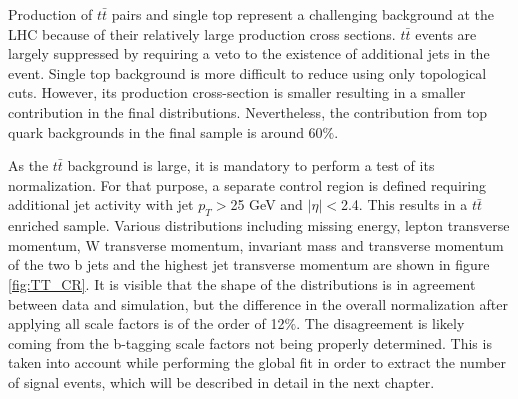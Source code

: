Production of $t\bar{t}$ pairs and single top represent a challenging background at the LHC because of their relatively large production cross sections. $t\bar{t}$ events are largely suppressed by requiring a veto to the existence of additional jets in the event. Single top background is more difficult to reduce using only topological cuts. However, its production cross-section is smaller resulting in a smaller contribution in the final distributions. Nevertheless, the contribution from top quark backgrounds in the final sample is around 60$\%$.
\par As the $t\bar{t}$ background is large, it is mandatory to perform a test of its normalization. For that purpose, a separate control region is defined requiring additional jet activity with jet $p_T>$25 GeV and $|\eta|<$2.4. This results in a $t\bar{t}$ enriched sample. Various distributions including missing energy, lepton transverse momentum, W transverse momentum, invariant mass and transverse momentum of the two b jets and the highest jet transverse momentum are shown in figure \ref{fig:TT_CR}. It is visible that the shape of the distributions is in agreement between data and simulation, but the difference in the overall normalization after applying all scale factors is of the order of 12$\%$. The disagreement is likely coming from the b-tagging scale factors not being properly determined. This is taken into account while performing the global fit in order to extract the number of signal events, which will be described in detail in the next chapter. 
